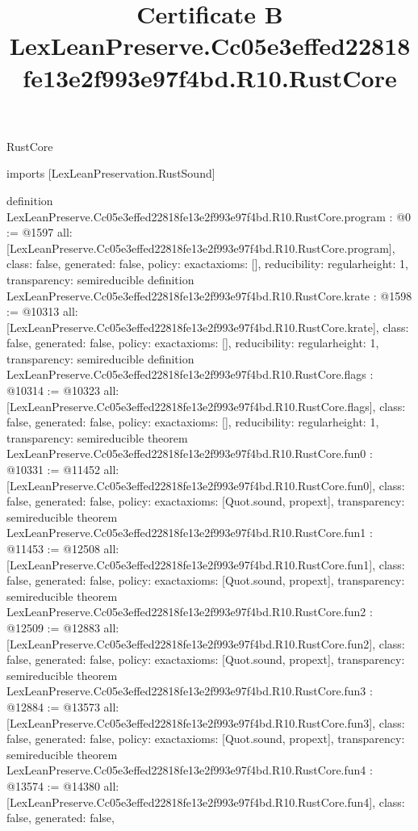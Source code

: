 \begin{lexlean}{RustCore}
\title{Certificate B LexLeanPreserve.Cc05e3effed22818fe13e2f993e97f4bd.R10.RustCore}
\begin{coremodule}
imports [LexLeanPreservation.RustSound]

definition LexLeanPreserve.Cc05e3effed22818fe13e2f993e97f4bd.R10.RustCore.program : @0 := @1597 {
  all: [LexLeanPreserve.Cc05e3effed22818fe13e2f993e97f4bd.R10.RustCore.program],
  class: false,
  generated: false,
  policy: exact{axioms: []},
  reducibility: regular{height: 1},
  transparency: semireducible
}
definition LexLeanPreserve.Cc05e3effed22818fe13e2f993e97f4bd.R10.RustCore.krate : @1598 := @10313 {
  all: [LexLeanPreserve.Cc05e3effed22818fe13e2f993e97f4bd.R10.RustCore.krate],
  class: false,
  generated: false,
  policy: exact{axioms: []},
  reducibility: regular{height: 1},
  transparency: semireducible
}
definition LexLeanPreserve.Cc05e3effed22818fe13e2f993e97f4bd.R10.RustCore.flags : @10314 := @10323 {
  all: [LexLeanPreserve.Cc05e3effed22818fe13e2f993e97f4bd.R10.RustCore.flags],
  class: false,
  generated: false,
  policy: exact{axioms: []},
  reducibility: regular{height: 1},
  transparency: semireducible
}
theorem LexLeanPreserve.Cc05e3effed22818fe13e2f993e97f4bd.R10.RustCore.fun0 : @10331 := @11452 {
  all: [LexLeanPreserve.Cc05e3effed22818fe13e2f993e97f4bd.R10.RustCore.fun0],
  class: false,
  generated: false,
  policy: exact{axioms: [Quot.sound, propext]},
  transparency: semireducible
}
theorem LexLeanPreserve.Cc05e3effed22818fe13e2f993e97f4bd.R10.RustCore.fun1 : @11453 := @12508 {
  all: [LexLeanPreserve.Cc05e3effed22818fe13e2f993e97f4bd.R10.RustCore.fun1],
  class: false,
  generated: false,
  policy: exact{axioms: [Quot.sound, propext]},
  transparency: semireducible
}
theorem LexLeanPreserve.Cc05e3effed22818fe13e2f993e97f4bd.R10.RustCore.fun2 : @12509 := @12883 {
  all: [LexLeanPreserve.Cc05e3effed22818fe13e2f993e97f4bd.R10.RustCore.fun2],
  class: false,
  generated: false,
  policy: exact{axioms: [Quot.sound, propext]},
  transparency: semireducible
}
theorem LexLeanPreserve.Cc05e3effed22818fe13e2f993e97f4bd.R10.RustCore.fun3 : @12884 := @13573 {
  all: [LexLeanPreserve.Cc05e3effed22818fe13e2f993e97f4bd.R10.RustCore.fun3],
  class: false,
  generated: false,
  policy: exact{axioms: [Quot.sound, propext]},
  transparency: semireducible
}
theorem LexLeanPreserve.Cc05e3effed22818fe13e2f993e97f4bd.R10.RustCore.fun4 : @13574 := @14380 {
  all: [LexLeanPreserve.Cc05e3effed22818fe13e2f993e97f4bd.R10.RustCore.fun4],
  class: false,
  generated: false,
}
\end{coremodule}
\end{lexlean}
